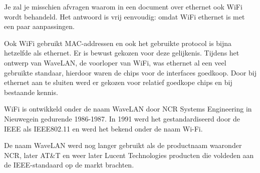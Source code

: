 Je zal je misschien afvragen waarom in een document over ethernet ook WiFi wordt behandeld. Het antwoord is vrij eenvoudig: omdat WiFi ethernet is met een paar aanpassingen.

Ook WiFi gebruikt MAC-addressen en ook het gebruikte protocol is bijna hetzelfde als ethernet. Er is bewust gekozen voor deze gelijkenis. Tijdens het ontwerp van WaveLAN, de voorloper van WiFi, was ethernet al een veel gebruikte standaar, hierdoor waren de chips voor de interfaces goedkoop. Door bij ethernet aan te sluiten werd er gekozen voor relatief goedkope chips en bij bestaande kennis.

WiFi is ontwikkeld onder de naam WaveLAN door NCR Systems Engineering in Nieuwegein gedurende 1986-1987. In 1991 werd het gestandardiseerd door de IEEE als IEEE802.11 en werd het bekend onder de naam Wi-Fi.

De naam WaveLAN werd nog langer gebruikt als de productnaam waaronder NCR, later AT\&T en weer later Lucent Technologies producten die voldeden aan de IEEE-standaard op de markt brachten.
